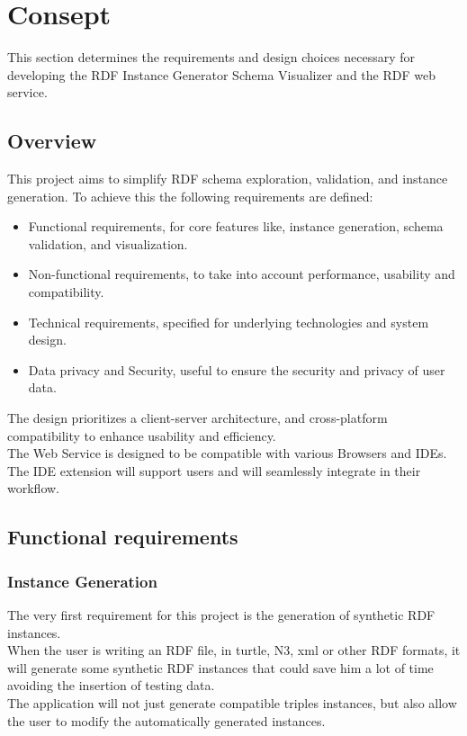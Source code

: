 \chapter{Consept\label{cha:chapter3}}
This section determines the requirements and design choices necessary for developing the RDF Instance Generator Schema Visualizer and the RDF web service.

\section{Overview\label{sec:reqoverview}}

This project aims to simplify RDF schema exploration, validation, and instance generation. To achieve this the following requirements are defined: 
\begin{itemize}
    \item Functional requirements, for core features like, instance generation, schema validation, and visualization.
    \item Non-functional requirements, to take into account performance, usability and compatibility.
    \item Technical requirements, specified for underlying technologies and system design.
    \item Data privacy and Security, useful to ensure the security and privacy of user data.
\end{itemize}

The design prioritizes a client-server architecture, and cross-platform compatibility to enhance usability and efficiency. 
\\
The Web Service is designed to be compatible with various Browsers and IDEs. 
\\
The IDE extension will support users and will seamlessly integrate in their workflow.
\section{Functional requirements\label{sec:techreq}}
\subsection{Instance Generation\label{sec:reqsuba}}
The very first requirement for this project is the generation of synthetic RDF instances.
\\
When the user is writing an RDF file, in turtle, N3, xml or other RDF formats, it will generate some synthetic RDF instances that could save him a lot of time avoiding the insertion of testing data.
\\
The application will not just generate compatible triples instances, but also allow the user to modify the automatically generated instances.

